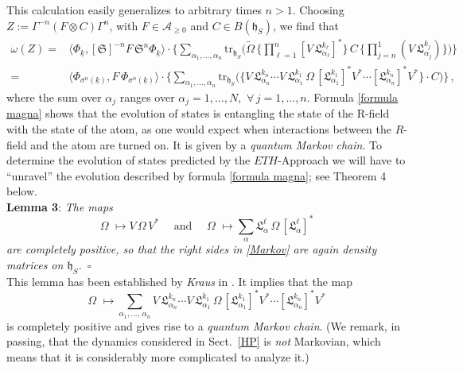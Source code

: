 \documentclass[a4paper,11pt]{article}
\begin{document}
This calculation easily generalizes to arbitrary times $n>1$. Choosing 
 $Z:= \Gamma^{-n} (F\otimes C) \Gamma^{n}$, with $F\in \mathcal{A}_{\geq 0}$ and $C\in B(\mathfrak{h}_{S})$, 
  we find that
 \begin{align}\label{formula magna}
 \omega(Z)=& \langle \Phi_{\underline{k}}, [\mathfrak{S}]^{-n} F\, \mathfrak{S}^{n} \Phi_{\underline{k}}\rangle \cdot
\Big\{ \sum_{\alpha_1, \dots, \alpha_n} \text{tr}_{\mathfrak{h}_S} \Big(\widetilde{\Omega}\, \Big\{\prod_{\ell = 1}^{n} [V\,\mathfrak{L}_{\alpha_{\ell}}^{k_{\ell}}]^{*}\Big\}\, C\, \Big\{ \prod_{j=n}^{1} (V\, \mathfrak{L}_{\alpha_j}^{k_j})\Big\} \Big) \Big\}\nonumber \\
 =& \langle \Phi_{\sigma^{n}(\underline{k})}, F \,\Phi_{\sigma^{n}(\underline{k})} \rangle\cdot \Big\{\sum_{\alpha_1, \dots, \alpha_n} 
 \text{tr}_{\mathfrak{h}_S} \Big(\Big\{V\,\mathfrak{L}_{\alpha_n}^{k_n} \cdots V\,\mathfrak{L}_{\alpha_1}^{k_1} \,\Omega\, 
 [\mathfrak{L}_{\alpha_1}^{k_1}]^{*}V^{*}\cdots [\mathfrak{L}_{\alpha_n}^{k_n}]^{*}V^{*}\Big\}\cdot C\Big) \Big\}\,,
 \end{align}
where the sum over $\alpha_j$ ranges over $\alpha_j =1,\dots, N,\,\, \forall\, j=1,\dots, n$. Formula \eqref{formula magna} 
shows that the evolution of states is entangling the state of the R-field with the state of the atom, as one 
would expect when interactions between the $R$-field and the atom are turned on. It is given by a 
\textit{quantum Markov chain}. To determine the evolution of states predicted by the $ETH$-Approach we 
will have to ``unravel'' the evolution described by formula \eqref{formula magna}; see Theorem 4 below.\\

{\bf{Lemma 3}}: \textit{The maps
\begin{equation}\label{Markov}
\Omega\,\, \mapsto V\,\Omega\,V^{*}\quad \text{ and }\quad
\Omega\,\, \mapsto \sum_{\alpha} \mathfrak{L}_{\alpha}^{\ell}\,\Omega\, [\mathfrak{L}_{\alpha}^{\ell}]^{*}
\end{equation}
are \textit{completely positive}, so that the right sides in \eqref{Markov} are again density matrices on $\mathfrak{h}_S$.}
\,$\square$\\

This lemma has been established by \textit{Kraus} in \cite{Kraus}. It implies that the map 
$$\Omega\,\,\mapsto \sum_{\alpha_1, \dots, \, \alpha_n} V\,\mathfrak{L}_{\alpha_n}^{k_n} \cdots V\,\mathfrak{L}_{\alpha_1}^{k_1} \,\Omega\, 
 [\mathfrak{L}_{\alpha_1}^{k_1}]^{*}V^{*}\cdots [\mathfrak{L}_{\alpha_n}^{k_n}]^{*}V^{*}$$
is completely positive and gives rise to a \textit{quantum Markov chain}. (We remark, in passing, that the dynamics considered in Sect.~\ref{HP} is \textit{not} Markovian, which means that it is considerably more complicated to analyze it.)\\
\end{document}
